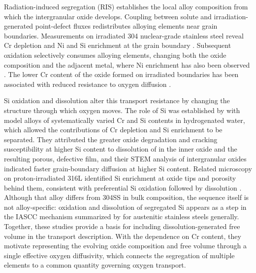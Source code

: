 \documentclass[12pt]{article}
\begin{document}
Radiation-induced segregation (RIS) establishes the local alloy
composition from which the intergranular oxide develops. Coupling between
solute and irradiation-generated point-defect fluxes redistributes
alloying elements near grain boundaries. Measurements on irradiated
304 nuclear-grade stainless steel reveal Cr depletion and Ni and Si enrichment
at the grain boundary \cite{deng2021grain}. Subsequent
oxidation selectively consumes alloying elements, changing both the oxide
composition and the adjacent metal, where Ni enrichment has also been
observed \cite{deng2021grain}. The lower Cr content of the oxide
formed on irradiated boundaries has been associated with reduced
resistance to oxygen diffusion \cite{deng2017effect}. 

Si oxidation and dissolution alter this transport resistance by changing
the structure through which oxygen moves. The role of Si was established by
\textcite{du2026silicon} with model alloys of systematically varied Cr and
Si contents in hydrogenated water, which allowed the contributions of Cr
depletion and Si enrichment to be separated. They
attributed the greater oxide degradation and cracking susceptibility at
higher Si content to dissolution of  in the inner oxide and the
resulting porous, defective film, and their STEM analysis of intergranular
oxides indicated faster grain-boundary diffusion at higher Si content. Related microscopy on
proton-irradiated 316L identified Si enrichment at oxide tips and
porosity behind them, consistent with preferential Si oxidation followed
by dissolution \parencite{kuang2022highresolution}. Although that alloy
differs from 304SS in bulk composition, the sequence itself is not
alloy-specific: oxidation and dissolution of segregated Si appears as a
step in the IASCC mechanism summarized by \textcite{was2024how} for
austenitic stainless steels generally. Together, these studies provide
a basis for including dissolution-generated free volume in the transport
description. With the dependence on Cr content, they motivate
representing the evolving oxide composition and free volume through a
single effective oxygen diffusivity, which connects the segregation of
multiple elements to a common quantity governing oxygen transport.
\end{document}
